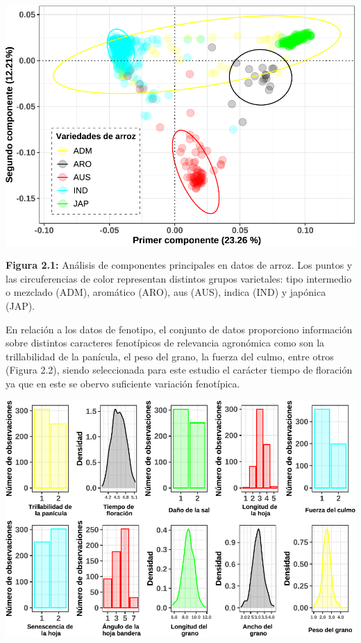 \documentclass[11pt,spanish,a4paper,oneside,]{book} %
\begin{document}
\begin{center}\includegraphics[width=1\linewidth]{figures/Graf_PCA} \end{center}

\begin{center}
\textbf{Figura 2.1:} Análisis de componentes principales en datos de arroz. Los puntos y las circuferencias de color representan distintos grupos varietales: tipo intermedio o mezclado (ADM), aromático (ARO), aus (AUS), indica (IND) y japónica (JAP).

\end{center}

En relación a los datos de fenotipo, el conjunto de datos proporciono información sobre distintos caracteres fenotípicos de relevancia agronómica como son la trillabilidad de la panícula, el peso del grano, la fuerza del culmo, entre otros (Figura 2.2), siendo seleccionada para este estudio el carácter tiempo de floración ya que en este se obervo suficiente variación fenotípica.

\begin{center}\includegraphics[width=1\linewidth]{figures/Graf_feno} \end{center}
\end{document}
